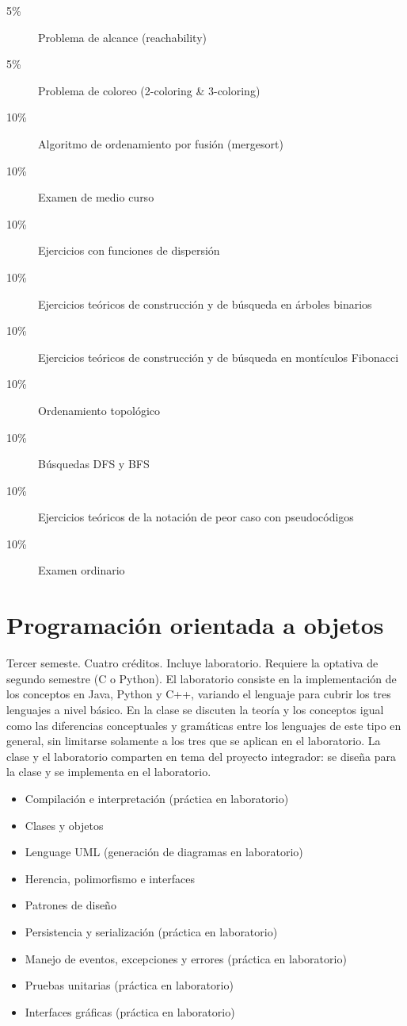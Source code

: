 \documentclass{article}
\begin{document}
\begin{multicols}{4}
\begin{description}
\item[5\%]{Problema de alcance (reachability)}
\item[5\%]{Problema de coloreo (2-coloring \& 3-coloring)}
\item[10\%]{Algoritmo de ordenamiento por fusi\'{o}n (mergesort)}
\item[10\%]{Examen de medio curso}
\item[10\%]{Ejercicios con funciones de dispersi\'{o}n}
\item[10\%]{Ejercicios te\'{o}ricos de construcci\'{o}n y de b\'{u}squeda en \'{a}rboles binarios}
\item[10\%]{Ejercicios te\'{o}ricos de construcci\'{o}n y de b\'{u}squeda en mont\'{i}culos Fibonacci}
\item[10\%]{Ordenamiento topol\'{o}gico}
\item[10\%]{B\'{u}squedas DFS y BFS}
\item[10\%]{Ejercicios te\'{o}ricos de la notaci\'{o}n de peor caso con pseudoc\'{o}digos}
\item[10\%]{Examen ordinario}
\end{description}

\vfill\null \columnbreak

\hypertarget{poao}{\section*{Programaci\'{o}n orientada a objetos}}

Tercer semeste. Cuatro cr\'{e}ditos. Incluye laboratorio. Requiere la
optativa de segundo semestre (C o Python). El laboratorio consiste en
la implementaci\'{o}n de los conceptos en Java, Python y C++, variando el
lenguaje para cubrir los tres lenguajes a nivel b\'{a}sico. En la clase se
discuten la teor\'{i}a y los conceptos igual como las diferencias
conceptuales y gram\'{a}ticas entre los lenguajes de este tipo en general,
sin limitarse solamente a los tres que se aplican en el
laboratorio. La clase y el laboratorio comparten en tema del proyecto
integrador: se dise\~{n}a para la clase y se implementa en el laboratorio.

\begin{itemize}
\item{Compilaci\'{o}n e interpretaci\'{o}n (pr\'{a}ctica en laboratorio)}
\item{Clases y objetos}
\item{Lenguage UML (generaci\'{o}n de diagramas en laboratorio)}
\item{Herencia, polimorfismo e interfaces}
\item{Patrones de dise\~{n}o}
\item{Persistencia y serializaci\'{o}n (pr\'{a}ctica en laboratorio)}
\item{Manejo de eventos, excepciones y errores (pr\'{a}ctica en laboratorio)}
\item{Pruebas unitarias (pr\'{a}ctica en laboratorio)}
\item{Interfaces gr\'{a}ficas (pr\'{a}ctica en laboratorio)}
\end{itemize}


\end{multicols}
\end{document}

